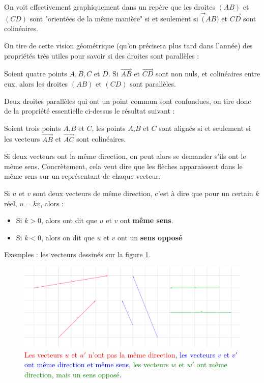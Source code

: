 \documentclass[10pt,a4paper,oneside]{book}
\begin{document}
  On voit effectivement graphiquement dans un repère que les droites $(AB)$ et $(CD)$ sont "orientées de la même manière" si et seulement si $\overrightarrow(AB)$ et $\overrightarrow{CD}$ sont colinéaires. 

On tire de cette vision géométrique (qu'on précisera plus tard dans l'année) des propriétés très utiles pour savoir si des droites sont parallèles :

\begin{prop}
      Soient quatre points $A,B,C$ et $D$. Si $\overrightarrow{AB}$ et $\overrightarrow{CD}$ sont non nuls, et colinéaires entre eux, alors les droites $(AB)$ et $(CD)$ sont parallèles. 
\end{prop}

Deux droites parallèles qui ont un point commun sont confondues, on tire donc de la propriété essentielle ci-dessus le résultat suivant :

\begin{prop}
  Soient trois points $A$,$B$ et $C$, les points $A$,$B$ et $C$ sont alignés si et seulement si les vecteurs $\overrightarrow{AB}$ et $\overrightarrow{AC}$ sont colinéaires.
\end{prop}

Si deux vecteurs ont la même direction, on peut alors se demander s'ils ont le même sens. Concrètement, cela veut dire que les flèches apparaissent dans le même sens sur un représentant de chaque vecteur.

\begin{de}
  Si $u$ et $v$ sont deux vecteurs de même direction, c'est à dire que pour un certain $k$ réel, $u=kv$, alors : 
  \begin{itemize}
    \item Si $k>0$, alors ont dit que $u$ et $v$ ont \textbf{même sens}. 
    \item Si $k<0$, alors on dit que $u$ et $v$ ont un \textbf{sens opposé}
  \end{itemize}
\end{de}

Exemples : les vecteurs dessinés sur la figure \ref{fig:DirectionSens}.

\begin{figure}
  \centering
\includegraphics[width=1.0\textwidth]{Vecteurs-DirectionSens.png}
\caption{\textcolor{red}{Les vecteurs $u$ et $u'$ n'ont pas la même direction}, \textcolor{blue}{les vecteurs $v$ et $v'$ ont même direction et même sens}, \textcolor{green}{les vecteurs $w$ et $w'$ ont même direction, mais un sens opposé}.}
\label{fig:DirectionSens}
\end{figure}
\end{document}
